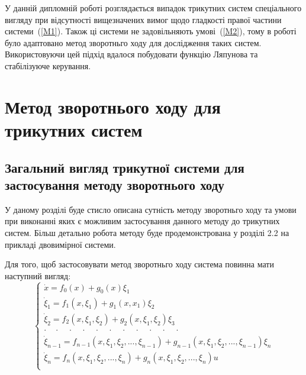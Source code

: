 \documentclass{article}
\begin{document}
У данній дипломній роботі розглядається випадок трикутних систем спеціального вигляду при відсутності вищезначених вимог
щодо гладкості правої  частини системи~(\ref{M1}). 
Також ці системи не задовільняють умові~(\ref{M2}), тому в роботі було адаптовано метод 
зворотньго ходу для дослідження таких систем.  Використовуючи цей підхід вдалося 
побудовати функцію Ляпунова та стабілізуюче керування. 
\pagebreak

\section{Метод зворотнього ходу для трикутних систем}
\subsection{Загальний вигляд трикутної системи для застосування методу зворотнього ходу}
У даному розділі буде стисло описана сутність методу зворотньго ходу та умови  
при виконанні яких є можливим застосування данного методу до трикутних систем. Більш детально 
робота методу буде продемонстрована у розділі 2.2 на прикладі двовимірної системи.

Для того, щоб застосовувати метод зворотньго ходу система повинна мати наступний вигляд:
\begin{equation} \label{strict-feedback system}
    \begin{cases}
        \dot x           = f_0(x)+g_0(x)\xi_1\\
        \dot \xi_1       = f_1(x, \xi_1)+g_{1}(x, x_1)\xi_2 \\
        \dot \xi_2       = f_2(x, \xi_1, \xi_2) + g_2(x, \xi_1, \xi_2)\xi_3 \\
       \cdot \quad \cdot \quad \cdot \quad \cdot  \quad \cdot  \quad \cdot
        \quad \cdot  \quad \cdot  \quad \cdot  \quad \cdot  \quad \cdot\\

       \dot \xi_{n-1}   = f_{n-1}(x, \xi_1, \xi_2, ... ,\xi_{n-1}) 
        +g_{n-1}(x, \xi_1, \xi_2, ... ,\xi_{n-1}) \xi_n\\
        \dot \xi_{n}     = f_{n}(x, \xi_1, \xi_2, ... ,\xi_{n}) 
        +g_{n}(x, \xi_1, \xi_2, ... ,\xi_{n})u\\

	\end{cases}
\end{equation}
\end{document}
